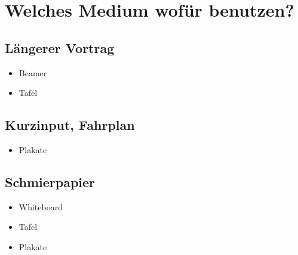 \section{Welches Medium wofür benutzen?}
\label{medien}

\subsection{Längerer Vortrag}
\begin{itemize}
    \item Beamer
    \item Tafel
\end{itemize}

\subsection{Kurzinput, Fahrplan}
\begin{itemize}
    \item Plakate
\end{itemize}

\subsection{\glqq Schmierpapier\grqq}
\begin{itemize}
    \item Whiteboard
    \item Tafel
    \item Plakate
\end{itemize}
